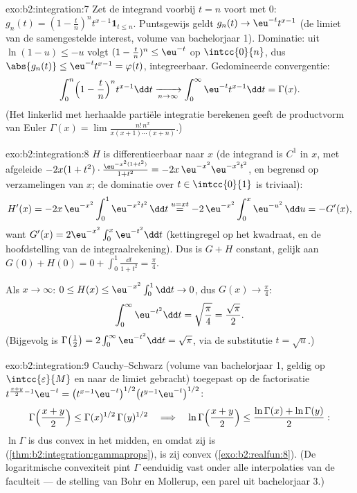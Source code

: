 \begin{solution}{exo:b2:integration:7}
Zet de integrand voorbij $t = n$ voort met $0$: $g_n(t) = (1 -
\frac tn)^n t^{x-1}\mathbf{1}_{t \leq n}$. Puntsgewijs geldt
$g_n(t) \to \eu^{-t}t^{x-1}$ (de limiet van de samengestelde
interest, volume van bachelorjaar 1). Dominatie: uit $\ln(1 - u)
\leq -u$ volgt $(1 - \frac tn)^n \leq \eu^{-t}$ op
$\intcc{0}{n}$, dus $\abs{g_n(t)} \leq \eu^{-t}t^{x-1} =
\varphi(t)$, integreerbaar. Gedomineerde convergentie:
\[
\int_0^n \Bigl(1 - \frac tn\Bigr)^n t^{x-1}\dd t
\xrightarrow[n\to\infty]{} \int_0^\infty \eu^{-t}t^{x-1}\dd t
= \Gamma(x) .
\]
(Het linkerlid met herhaalde partiële integratie berekenen geeft
de productvorm van Euler $\Gamma(x) = \lim
\frac{n!\,n^x}{x(x+1)\cdots(x+n)}$.)
\end{solution}

\begin{solution}{exo:b2:integration:8}
$H$ is differentieerbaar naar $x$ (de integrand is $C^1$ in $x$,
met afgeleide $-2x(1+t^2)\cdot\frac{\eu^{-x^2(1+t^2)}}{1+t^2} =
-2x\,\eu^{-x^2}\eu^{-x^2t^2}$,  en begrensd op 
verzamelingen van $x$; de dominatie over $t \in \intcc{0}{1}$ is
triviaal):
\[
H'(x) = -2x\,\eu^{-x^2}\int_0^1 \eu^{-x^2t^2}\,\dd t
\overset{u = xt}{=} -2\,\eu^{-x^2}\int_0^x \eu^{-u^2}\,\dd u
= -G'(x),
\]
want $G'(x) = 2\eu^{-x^2}\int_0^x \eu^{-t^2}\dd t$ (kettingregel op
het kwadraat, en de hoofdstelling van de integraalrekening). Dus is
$G + H$ constant, gelijk aan $G(0) + H(0) = 0 + \int_0^1 \frac{\dd
t}{1+t^2} = \frac\pi4$.

Als $x \to \infty$: $0 \leq H(x) \leq \eu^{-x^2}\int_0^1 \dd t \to
0$, dus $G(x) \to \frac\pi4$:
\[
\int_0^\infty \eu^{-t^2}\dd t = \sqrt{\frac\pi4} =
\frac{\sqrt\pi}{2} .
\]
(Bijgevolg is $\Gamma\bigl(\frac12\bigr) = 2\int_0^\infty
\eu^{-t^2}\dd t = \sqrt\pi$, via de substitutie $t = \sqrt u$.)
\end{solution}

\begin{solution}{exo:b2:integration:9}
Cauchy--Schwarz (volume van bachelorjaar 1, geldig op
$\intcc{\varepsilon}{M}$ en naar de limiet gebracht) toegepast op
de factorisatie $t^{\frac{x+y}{2}-1}\eu^{-t} =
\bigl(t^{x-1}\eu^{-t}\bigr)^{1/2}
\bigl(t^{y-1}\eu^{-t}\bigr)^{1/2}$:
\[
\Gamma\Bigl(\frac{x+y}{2}\Bigr) \leq
\Gamma(x)^{1/2}\,\Gamma(y)^{1/2}
\quad\Longrightarrow\quad
\ln\Gamma\Bigl(\frac{x+y}{2}\Bigr) \leq \frac{\ln\Gamma(x) +
\ln\Gamma(y)}{2} :
\]
$\ln\Gamma$ is dus convex in het midden, en omdat zij  is
(\cref{thm:b2:integration:gammaprops}), is zij convex
(\cref{exo:b2:realfun:8}). (De logaritmische convexiteit pint
$\Gamma$ eenduidig vast onder alle interpolaties van de faculteit
--- de stelling van Bohr en Mollerup, een parel uit bachelorjaar
3.)
\end{solution}

